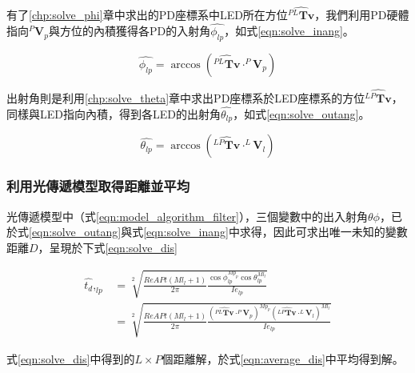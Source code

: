         有了\ref{chp:solve_phi}章中求出的PD座標系中LED所在方位$\hat{{^{PL}\boldsymbol{Tv}}}$，我們利用PD硬體指向$^P\boldsymbol{V}_p$與方位的內積獲得各PD的入射角$\hat{\phi_{lp}}$，如式\ref{eqn:solve_inang}。
        
        \begin{equation}
            \label{eqn:solve_inang}
            \hat{\phi_{lp}} = \arccos(\hat{{^{PL}\boldsymbol{Tv}}}\cdot ^P\boldsymbol{V}_p)
        \end{equation}
        
        出射角則是利用\ref{chp:solve_theta}章中求出PD座標系於LED座標系的方位$\hat{{^{LP}\boldsymbol{Tv}}}$，同樣與LED指向內積，得到各LED的出射角$\hat{\theta_{lp}}$，如式\ref{eqn:solve_outang}。

        \begin{equation}
            \label{eqn:solve_outang}
            \hat{\theta_{lp}} = \arccos(\hat{{^{LP}\boldsymbol{Tv}}}\cdot ^L\boldsymbol{V}_l)
        \end{equation}

        \subsubsection{利用光傳遞模型取得距離並平均}
        \label{chp:dis_average}

        光傳遞模型中（式\ref{eqn:model_algorithm_filter}），三個變數中的出入射角$\theta\phi$，已於式\ref{eqn:solve_outang}與式\ref{eqn:solve_inang}中求得，因此可求出唯一未知的變數距離$D$，呈現於下式\ref{eqn:solve_dis}

        \begin{equation}
            \label{eqn:solve_dis}
            \begin{aligned}
            \hat{t_d },_{lp} &= \sqrt[2]{\frac{ReAPt (Ml_{l}+1)}{2\pi}
                \frac{\cos\phi_{lp}^{Mp_{p}}\cos \theta_{lp}^{Ml_{l}} }
                {Ie_{lp}}
            }\\
            & = \sqrt[2]
            {
                \frac{ReAPt (Ml_{l}+1)}{2\pi}
                \frac{
                    (\hat{{^{PL}\boldsymbol{Tv}}}\cdot ^P\boldsymbol{V}_p)^{Mp_{p}}
                    (\hat{{^{LP}\boldsymbol{Tv}}}\cdot ^L\boldsymbol{V}_l)^{Ml_{l}} }
                {Ie_{lp}}
            }
            \end{aligned}
        \end{equation}


        式\ref{eqn:solve_dis}中得到的$L\times P$個距離解，於式\ref{eqn:average_dis}中平均得到解。

